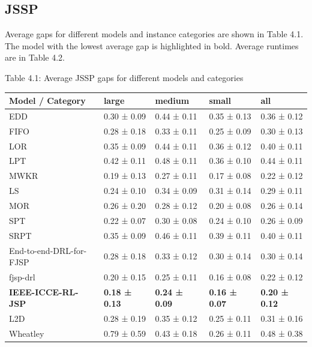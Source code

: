 \subsection{JSSP} \label{results_jssp}
Average gaps for different models and instance categories are shown in Table 4.1. The model with the lowest average gap is highlighted in bold. Average runtimes are in Table 4.2. 

\begin{table}
    Table 4.1: Average JSSP gaps for different models and categories\\
    \vspace{1mm}
    \small 
    \begin{tabular}{lllll}
        \toprule
        Model / Category & large & medium & small & all \\ 
        \midrule
        EDD & 0.30 ± 0.09 & 0.44 ± 0.11 & 0.35 ± 0.13 & 0.36 ± 0.12 \\
        FIFO & 0.28 ± 0.18 & 0.33 ± 0.11 & 0.25 ± 0.09 & 0.30 ± 0.13  \\
        LOR & 0.35 ± 0.09 & 0.44 ± 0.11 & 0.36 ± 0.12 & 0.40 ± 0.11\\
        LPT & 0.42 ± 0.11 & 0.48 ± 0.11 & 0.36 ± 0.10 & 0.44 ± 0.11\\
        MWKR & 0.19 ± 0.13 & 0.27 ± 0.11 & 0.17 ± 0.08 & 0.22 ± 0.12 \\
        LS & 0.24 ± 0.10 & 0.34 ± 0.09 & 0.31 ± 0.14 & 0.29 ± 0.11 \\
        MOR & 0.26 ± 0.20 & 0.28 ± 0.12 & 0.20 ± 0.08 & 0.26 ± 0.14 \\
        SPT & 0.22 ± 0.07 & 0.30 ± 0.08 & 0.24 ± 0.10 & 0.26 ± 0.09 \\
        SRPT & 0.35 ± 0.09 & 0.46 ± 0.11 & 0.39 ± 0.11 & 0.40 ± 0.11 \\
        End-to-end-DRL-for-FJSP & 0.28 ± 0.18 & 0.33 ± 0.12 & 0.30 ± 0.14 & 0.30 ± 0.14  \\
        fjsp-drl & 0.20 ± 0.15 & 0.25 ± 0.11 & 0.16 ± 0.08 & 0.22 ± 0.12 \\
        \textbf{IEEE-ICCE-RL-JSP} & \textbf{0.18 ± 0.13} & \textbf{0.24 ± 0.09} & \textbf{0.16 ± 0.07} & \textbf{0.20 ± 0.12} \\
        L2D & 0.28 ± 0.19 & 0.35 ± 0.12 & 0.25 ± 0.11 & 0.31 ± 0.16 \\
        Wheatley & 0.79 ± 0.59 & 0.43 ± 0.18 & 0.26 ± 0.11 & 0.48 ± 0.38 \\
        \bottomrule
    \end{tabular}
\end{table}


